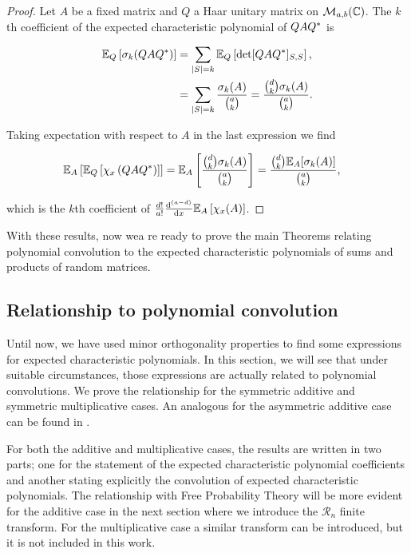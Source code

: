 \begin{proof}
    Let $A$ be a fixed matrix and $Q$ a Haar unitary matrix on $\mathcal M_{a,b}(\mathbb C)$. The $k$th coefficient of the expected characteristic polynomial of $QAQ^*$ is 

    \begin{align*}
        \mathbb E_Q \left[ \sigma_k(QAQ^*) \right] &= \sum_{\lvert S \rvert = k} \mathbb E_Q\left[ \det [QAQ^*]_{S,S} \right],\\ 
        &= \sum_{\lvert S \rvert = k} \frac{\sigma_k(A)}{\binom ak} = \frac{\binom{d}{k} \sigma_k(A)}{\binom{a}{k}}.
    \end{align*}

    Taking expectation with respect to $A$ in the last expression we find

    \begin{align*}
        \mathbb E_A \left[\mathbb E_Q\left[ \chi_x \left( Q A Q^* \right) \right]\right] &= \mathbb E_A \left[ \frac{\binom{d}{k} \sigma_k(A)}{\binom{a}{k}} \right] = \frac{\binom{d}{k} \mathbb E_A[\sigma_k(A)]}{\binom{a}{k}},
    \end{align*}

    \noindent which is the $k$th coefficient of $\frac{d!}{a!} \frac{\mathrm d^{(a-d)}}{\mathrm d x} \mathbb E_A \left[\chi_x(A) \right]$.
\end{proof}

With these results, now wea re ready to prove the main Theorems relating polynomial convolution to the expected characteristic polynomials of sums and products of random matrices.

\subsection{Relationship to polynomial convolution}

Until now, we have used minor orthogonality properties to find some expressions for expected characteristic polynomials. In this section, we will see that under suitable circumstances, those expressions are actually related to polynomial convolutions. We prove the relationship for the symmetric additive and symmetric multiplicative cases. An analogous for the asymmetric additive case can be found in \cite{article:finitefree}. 

For both the additive and multiplicative cases, the results are written in two parts; one for the statement of the expected characteristic polynomial coefficients and another stating explicitly the convolution of expected characteristic polynomials. The relationship with Free Probability Theory will be more evident for the additive case in the next section where we introduce the $\mathcal R_n$ finite transform. For the multiplicative case a similar transform can be introduced, but it is not included in this work. 

